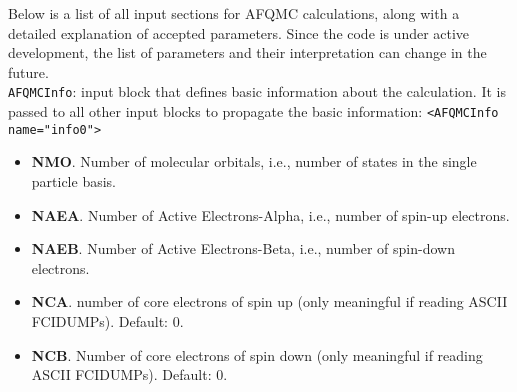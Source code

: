 Below is a list of all input sections for AFQMC calculations, along with a detailed explanation of accepted parameters. Since the code is under active development, the list of parameters and their interpretation can change in the future.\\

\texttt{AFQMCInfo}: input block that defines basic information about the calculation. It is passed to all other input blocks to propagate the basic information:
\texttt{<AFQMCInfo name="info0">}
\begin{itemize}
\item \textbf{NMO}. Number of molecular orbitals, i.e., number of states in the single particle basis. 
\item \textbf{NAEA}. Number of Active Electrons-Alpha, i.e., number of spin-up electrons.
\item \textbf{NAEB}. Number of Active Electrons-Beta, i.e., number of spin-down electrons.
\item \textbf{NCA}. number of core electrons of spin up (only meaningful if reading ASCII FCIDUMPs). Default: 0.
\item \textbf{NCB}. Number of core electrons of spin down (only meaningful if reading ASCII FCIDUMPs). Default: 0.\\
\end{itemize}


